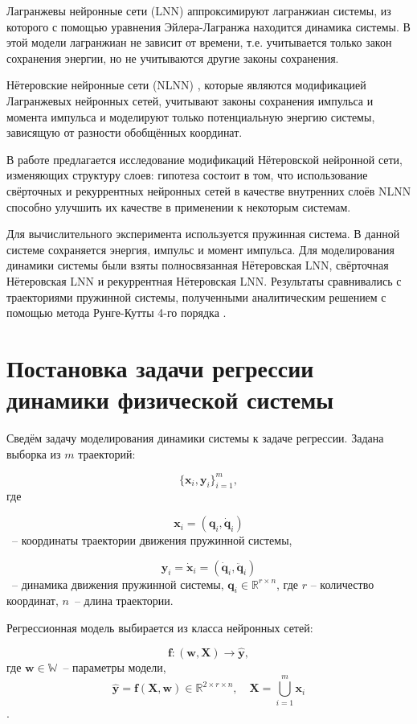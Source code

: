 \documentclass[12pt, twoside]{article}
\begin{document}
    Лагранжевы нейронные сети (LNN) \cite{cranmer2020lagrangian} аппроксимируют лагранжиан системы, из которого с помощью уравнения Эйлера-Лагранжа находится динамика системы. В этой модели лагранжиан не зависит от времени, т.е. учитывается только закон сохранения энергии, но не учитываются другие законы сохранения.

    Нётеровские нейронные сети (NLNN) \cite{master-tesis}, которые являются модификацией Лагранжевых нейронных сетей, учитывают законы сохранения импульса и момента импульса и моделируют только потенциальную энергию системы, зависящую от разности обобщённых координат. 

    В работе предлагается исследование модификаций Нётеровской нейронной сети, изменяющих структуру слоев: гипотеза состоит в том, что использование свёрточных и рекуррентных нейронных сетей в качестве внутренних слоёв NLNN способно улучшить их качестве в применении к некоторым системам.

    Для вычислительного эксперимента используется пружинная система. В данной системе сохраняется энергия, импульс и момент импульса. Для моделирования динамики системы были взяты полносвязанная Нётеровская LNN, свёрточная Нётеровская LNN и рекуррентная Нётеровская LNN. Результаты сравнивались с траекториями пружинной системы, полученными аналитическим решением с помощью метода Рунге-Кутты 4-го порядка \cite{atkinson1991introduction}.
    
\section{Постановка задачи регрессии динамики физической системы}

    Сведём задачу моделирования динамики системы к задаче регрессии. Задана выборка из $m$ траекторий: 

    $$\{\mathbf{x}_i, \mathbf{y}_i\}_{i=1}^m,$$ 
    где 
    
    $$\mathbf{x}_i = (\mathbf{q}_i, \mathbf{\dot{q}}_i)$$
    ~-- координаты траектории движения пружинной системы, 
    
    $$\mathbf{{y}}_i = \mathbf{\dot{x}}_i = (\mathbf{\dot{q}}_i, \mathbf{\ddot{q}}_i)$$
    ~-- динамика движения пружинной системы, $\mathbf{q}_i \in \mathbb{R}^{r \times n}$, где $r$ -- количество координат, $n$~-- длина траектории.

    Регрессионная модель выбирается из класса нейронных сетей:

    $$\mathbf{f} \colon (\mathbf{w}, \mathbf{X}) \to \hat{\mathbf{y}},$$ 
    где $\mathbf{w} \in \mathbb{W}$~-- параметры модели, 
    $$\hat{\mathbf{y}} = \mathbf{f} (\mathbf{X},\mathbf{w}) \in \mathbb{R}^{2\times r \times n}, \quad \mathbf{X} = \bigcup_{i=1}^m \mathbf{x}_i$$.
\end{document}
